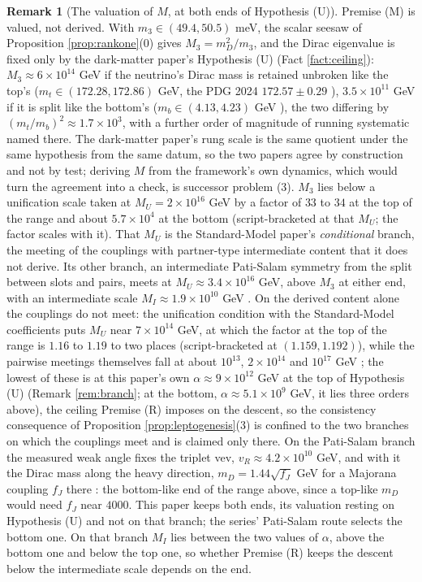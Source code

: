 \documentclass[11pt]{article}
\theoremstyle{definition}
\newtheorem{remark}[theorem]{Remark}
\begin{document}
\begin{remark}[The valuation of $M$, at both ends of Hypothesis (U)]\label{rem:valuation}
Premise (M) is valued, not derived. With $m_{3} \in (49.4, 50.5)$ meV, the scalar seesaw of Proposition \ref{prop:rankone}(0) gives $M_{3} = m_{D}^{2}/m_{3}$, and the Dirac eigenvalue is fixed only by the dark-matter paper's Hypothesis (U) (Fact \ref{fact:ceiling}): $M_{3} \approx 6 \times 10^{14}$ GeV if the neutrino's Dirac mass is retained unbroken like the top's ($m_{t} \in (172.28, 172.86)$ GeV, the PDG 2024 $172.57 \pm 0.29$ \cite{PDG2024}), $3.5 \times 10^{11}$ GeV if it is split like the bottom's ($m_{b} \in (4.13, 4.23)$ GeV \cite{PDG2024}), the two differing by $(m_{t}/m_{b})^{2} \approx 1.7 \times 10^{3}$, with a further order of magnitude of running systematic named there. The dark-matter paper's rung scale is the same quotient under the same hypothesis from the same datum, so the two papers agree by construction and not by test; deriving $M$ from the framework's own dynamics, which would turn the agreement into a check, is successor problem (3). $M_{3}$ lies below a unification scale taken at $M_{U} = 2 \times 10^{16}$ GeV by a factor of $33$ to $34$ at the top of the range and about $5.7 \times 10^{4}$ at the bottom (script-bracketed at that $M_{U}$; the factor scales with it). That $M_{U}$ is the Standard-Model paper's \emph{conditional} branch, the meeting of the couplings with partner-type intermediate content that it does not derive. Its other branch, an intermediate Pati-Salam symmetry from the split between slots and pairs, meets at $M_{U} \approx 3.4 \times 10^{16}$ GeV, above $M_{3}$ at either end, with an intermediate scale $M_{I} \approx 1.9 \times 10^{10}$ GeV \cite[Prop.~10.10]{ButlerT12}. On the derived content alone the couplings do not meet: the unification condition with the Standard-Model coefficients puts $M_{U}$ near $7 \times 10^{14}$ GeV, at which the factor at the top of the range is $1.16$ to $1.19$ to two places (script-bracketed at $(1.159, 1.192)$), while the pairwise meetings themselves fall at about $10^{13}$, $2 \times 10^{14}$ and $10^{17}$ GeV \cite[Prop.~6.2]{ButlerT12}; the lowest of these is at this paper's own $\alpha \approx 9 \times 10^{12}$ GeV at the top of Hypothesis (U) (Remark \ref{rem:branch}; at the bottom, $\alpha \approx 5.1 \times 10^{9}$ GeV, it lies three orders above), the ceiling Premise (R) imposes on the descent, so the consistency consequence of Proposition \ref{prop:leptogenesis}(3) is confined to the two branches on which the couplings meet and is claimed only there. On the Pati-Salam branch the measured weak angle fixes the triplet vev, $v_{R} \approx 4.2 \times 10^{10}$ GeV, and with it the Dirac mass along the heavy direction, $m_{D} = 1.44\sqrt{f_{J}}$ GeV for a Majorana coupling $f_{J}$ there \cite[Prop.~11.2]{ButlerT12}: the bottom-like end of the range above, since a top-like $m_{D}$ would need $f_{J}$ near $4000$. This paper keeps both ends, its valuation resting on Hypothesis (U) and not on that branch; the series' Pati-Salam route selects the bottom one. On that branch $M_{I}$ lies between the two values of $\alpha$, above the bottom one and below the top one, so whether Premise (R) keeps the descent below the intermediate scale depends on the end.

\end{remark}
\end{document}
